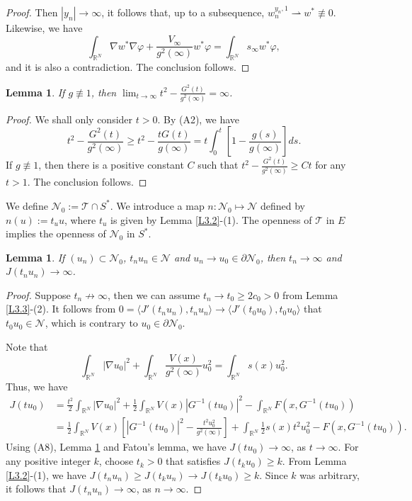 \documentclass[10pt,a4paper]{amsart}
\numberwithin{equation}{section}
\newtheorem{lemma}[theorem]{Lemma}
\begin{document}
\begin{proof}
Then $|y_n|\to\infty$,  it follows that, up to a subsequence, 
$w_n^{y_n,1} \rightharpoonup w^* \not\equiv 0$. Likewise, we have  
$$
\int_{\mathbb{R}^N}\nabla w^*\nabla\varphi+\frac{V_\infty}{g^2(\infty)}w^*\varphi=\int_{\mathbb{R}^N}s_\infty w^*\varphi,
$$ 
and it is also a contradiction. The conclusion follows.
\end{proof}

\begin{lemma}\label{L3.6} 
If $g\not\equiv1$, then $\lim_{t\to\infty}t^2-\frac{G^2(t)}{g^2(\infty)}=\infty$.
\end{lemma}

\begin{proof}
We  shall only  consider $t>0$. By (A2), we have 
$$
t^2-\frac{G^2(t)}{g^2(\infty)}\geq t^2-\frac{tG(t)}{g(\infty)}
=t \int_{0}^{t}[1-\frac{g(s)}{g(\infty)}]ds.
$$
If  $g\not\equiv1$, then there is a positive constant $C$ such that 
$t^2-\frac{G^2(t)}{g^2(\infty)}\geq Ct$ for any $t>1$. The conclusion follows.
\end{proof}


We define $\mathcal{N}_0:=\mathcal{T}\cap S^*$. We introduce a map 
$n:\mathcal{N}_0\mapsto \mathcal{N}$ defined by $n(u):=t_uu$, where $t_u$ is given 
by Lemma \ref{L3.2}-(1). The openness of $\mathcal{T}$ in $E$ implies the openness of 
$\mathcal{N}_0$ in $S^*$.

\begin{lemma}\label{L3.7} 
If $(u_n)\subset \mathcal{N}_0$, $t_nu_n\in\mathcal{N}$ and 
$u_n\to u_0\in \partial \mathcal{N}_0$, then $t_n\to \infty$ and $J(t_nu_n)\to \infty$.
\end{lemma}

\begin{proof}
Suppose $t_n\not\to\infty$, then we can assume $t_n\to t_0\geq 2 c_0>0$ from 
Lemma \ref{L3.3}-(2).
It follows from $0=\langle J'(t_nu_n),t_nu_n\rangle\to \langle J'(t_0u_0),t_0u_0\rangle$ 
that  $t_0u_0\in\mathcal{N}$, which is contrary to $u_0\in \partial \mathcal{N}_0$.

Note that
$$
\int_{\mathbb{R}^N}|\nabla u_0|^2+\int_{\mathbb{R}^N}\frac{V(x)}{g^2(\infty)}u^2_0=\int_{\mathbb{R}^N}s(x)u^2_0.
$$
Thus, we have 
\begin{align*}
 J(tu_0)&= \frac{t^2}{2}\int_{\mathbb{R}^{N}}|\nabla u_0|^{2}+\frac{1}{2}\int_{\mathbb{R}^N}V(x)|G^{-1}(tu_0)|^2-\int_{\mathbb{R}^{N}}F(x,G^{-1}(tu_0)) \\
        &= \frac{1}{2}\int_{\mathbb{R}^N}V(x)\left[|G^{-1}(tu_0)|^2-\frac{t^2u^2_0}{g^2(\infty)}\right]
        +\int_{\mathbb{R}^{N}}\frac{1}{2}s(x)t^2u^2_0-F(x,G^{-1}(tu_0)).
\end{align*}
Using (A8), Lemma \ref{L3.6} and Fatou's lemma, we have $J(tu_0)\to \infty$, as $t\to\infty$. 
For any positive integer $k$, choose $t_k>0$ that satisfies $J(t_ku_0)\geq k$. 
From Lemma \ref{L3.2}-(1), we have $J(t_nu_n)\geq J(t_ku_n)\to J(t_ku_0)\geq k$. 
Since $k$ was arbitrary, it follows that $J(t_nu_n)\to \infty$, as $n\to\infty$.
\end{proof}
\end{document}
